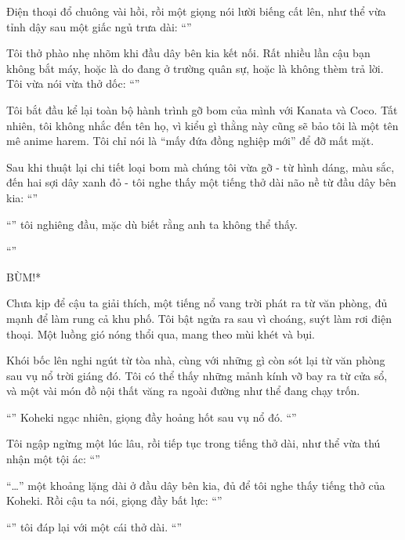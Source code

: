 \documentclass[../main.tex]{subfiles}
\begin{document}
Điện thoại đổ chuông vài hồi, rồi một giọng nói lười biếng cất lên, như thể vừa tỉnh dậy sau một giấc ngủ trưa dài: ``''

Tôi thở phào nhẹ nhõm khi đầu dây bên kia kết nối. Rất nhiều lần cậu bạn không bắt máy, hoặc là do đang ở trường quân sự, hoặc là không thèm trả lời. Tôi vừa nói vừa thở dốc: ``''

Tôi bắt đầu kể lại toàn bộ hành trình gỡ bom của mình với Kanata và Coco. Tất nhiên, tôi không nhắc đến tên họ, vì kiểu gì thằng này cũng sẽ bảo tôi là một tên mê anime harem. Tôi chỉ nói là ``mấy đứa đồng nghiệp mới'' để đỡ mất mặt.

Sau khi thuật lại chi tiết loại bom mà chúng tôi vừa gỡ - từ hình dáng, màu sắc, đến hai sợi dây xanh đỏ - tôi nghe thấy một tiếng thở dài não nề từ đầu dây bên kia: ``''

``''  tôi nghiêng đầu, mặc dù biết rằng anh ta không thể thấy.

``''

{\Large *BÙM!*}

Chưa kịp để cậu ta giải thích, một tiếng nổ vang trời phát ra từ văn phòng, đủ mạnh để làm rung cả khu phố. Tôi bật ngửa ra sau vì choáng, suýt làm rơi điện thoại. Một luồng gió nóng thổi qua, mang theo mùi khét và bụi.


Khói bốc lên nghi ngút từ tòa nhà, cùng với những gì còn sót lại từ văn phòng sau vụ nổ trời giáng đó. Tôi có thể thấy những mảnh kính vỡ bay ra từ cửa sổ, và một vài món đồ nội thất văng ra ngoài đường như thể đang chạy trốn.

``''  Koheki ngạc nhiên, giọng đầy hoảng hốt sau vụ nổ đó. ``''

Tôi ngập ngừng một lúc lâu, rồi tiếp tục trong tiếng thở dài, như thể vừa thú nhận một tội ác: ``''

``\dots''  một khoảng lặng dài ở đầu dây bên kia, đủ để tôi nghe thấy tiếng thở của Koheki. Rồi cậu ta nói, giọng đầy bất lực: ``''

``''  tôi đáp lại với một cái thở dài. ``''
\end{document}
